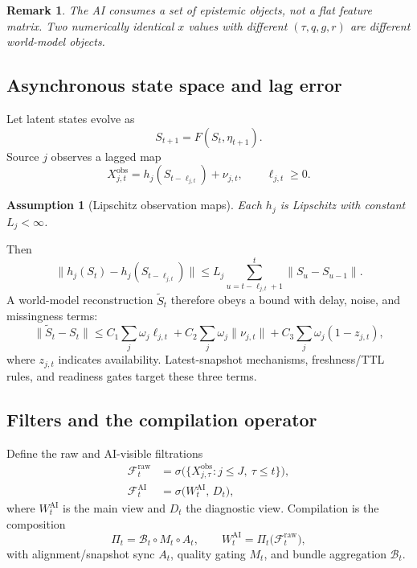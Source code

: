 \documentclass[12pt]{article}
\newtheorem{assumption}{Assumption}
\newtheorem{remark}{Remark}
\begin{document}
\begin{remark}
The AI consumes a set of epistemic objects, not a flat feature matrix. Two numerically identical $x$ values with different $(\tau,q,g,r)$ are different world-model objects.
\end{remark}

\subsection{Asynchronous state space and lag error}
Let latent states evolve as
\begin{equation}
S_{t+1}=F(S_t,\eta_{t+1}).
\label{eq:state}
\end{equation}
Source $j$ observes a lagged map
\begin{equation}
X^{\mathrm{obs}}_{j,t}=h_j(S_{t-\ell_{j,t}})+\nu_{j,t},\qquad \ell_{j,t}\ge 0.
\label{eq:lagobs}
\end{equation}
\begin{assumption}[Lipschitz observation maps]
Each $h_j$ is Lipschitz with constant $L_j<\infty$.
\end{assumption}
Then
\begin{equation}
\bigl\|h_j(S_t)-h_j(S_{t-\ell_{j,t}})\bigr\|
\le L_j\sum_{u=t-\ell_{j,t}+1}^{t}\|S_u-S_{u-1}\|.
\label{eq:lipschitz}
\end{equation}
A world-model reconstruction $\widetilde S_t$ therefore obeys a bound with delay, noise, and missingness terms:
\begin{equation}
\|\widetilde S_t-S_t\|
\le C_1\sum_j\omega_j\ell_{j,t}
+C_2\sum_j\omega_j\|\nu_{j,t}\|
+C_3\sum_j\omega_j(1-z_{j,t}),
\label{eq:recon}
\end{equation}
where $z_{j,t}$ indicates availability. Latest-snapshot mechanisms, freshness/TTL rules, and readiness gates target these three terms.

\subsection{Filters and the compilation operator}
Define the raw and AI-visible filtrations
\begin{align}
\mathcal{F}^{\mathrm{raw}}_t&=\sigma\bigl(\{X^{\mathrm{obs}}_{j,\tau}: j\le J,\ \tau\le t\}\bigr),
\label{eq:fraw}\\
\mathcal{F}^{\mathrm{AI}}_t&=\sigma\bigl(W^{\mathrm{AI}}_t,\,D_t\bigr),
\label{eq:fai}
\end{align}
where $W^{\mathrm{AI}}_t$ is the main view and $D_t$ the diagnostic view. Compilation is the composition
\begin{equation}
\Pi_t=\mathcal{B}_t\circ M_t\circ A_t,\qquad
W^{\mathrm{AI}}_t=\Pi_t\bigl(\mathcal{F}^{\mathrm{raw}}_t\bigr),
\label{eq:pi}
\end{equation}
with alignment/snapshot sync $A_t$, quality gating $M_t$, and bundle aggregation $\mathcal{B}_t$.
\end{document}
